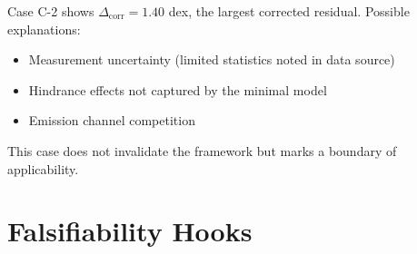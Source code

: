Case C-2 shows $\Delta_{\text{corr}} = 1.40$ dex, the largest corrected
residual. Possible explanations:
\begin{itemize}
    \item Measurement uncertainty (limited statistics noted in data source)
    \item Hindrance effects not captured by the minimal model
    \item Emission channel competition
\end{itemize}

This case does not invalidate the framework but marks a boundary of
applicability. \tagP

\section{Falsifiability Hooks}
\label{sec:sh:falsifiability}


